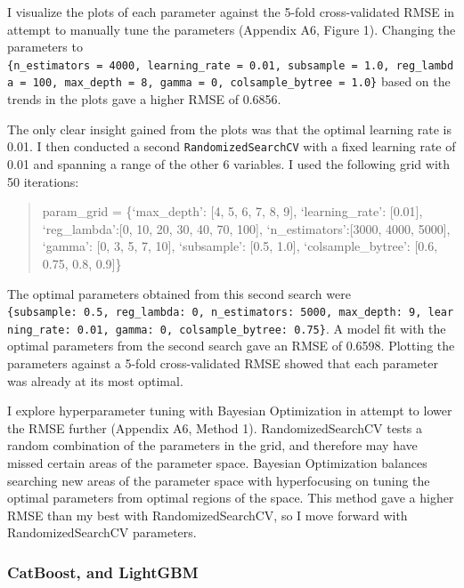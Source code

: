 \documentclass[
  letterpaper,
  DIV=11,
  numbers=noendperiod]{scrartcl}
\begin{document}
I visualize the plots of each parameter against the 5-fold
cross-validated RMSE in attempt to manually tune the parameters
(Appendix A6, Figure 1). Changing the parameters to
\texttt{\{n\_estimators\ =\ 4000,\ learning\_rate\ =\ 0.01,\ subsample\ =\ 1.0,\ reg\_lambda\ =\ 100,\ max\_depth\ =\ 8,\ gamma\ =\ 0,\ colsample\_bytree\ =\ 1.0\}}
based on the trends in the plots gave a higher RMSE of 0.6856.

The only clear insight gained from the plots was that the optimal
learning rate is 0.01. I then conducted a second
\texttt{RandomizedSearchCV} with a fixed learning rate of 0.01 and
spanning a range of the other 6 variables. I used the following grid
with 50 iterations:

\begin{quote}
param\_grid = \{`max\_depth': {[}4, 5, 6, 7, 8, 9{]}, `learning\_rate':
{[}0.01{]}, `reg\_lambda':{[}0, 10, 20, 30, 40, 70, 100{]},
`n\_estimators':{[}3000, 4000, 5000{]}, `gamma': {[}0, 3, 5, 7, 10{]},
`subsample': {[}0.5, 1.0{]}, `colsample\_bytree': {[}0.6, 0.75, 0.8,
0.9{]}\}
\end{quote}

The optimal parameters obtained from this second search were
\texttt{\{\textquotesingle{}subsample\textquotesingle{}:\ 0.5,\ \textquotesingle{}reg\_lambda\textquotesingle{}:\ 0,\ \textquotesingle{}n\_estimators\textquotesingle{}:\ 5000,\ \textquotesingle{}max\_depth\textquotesingle{}:\ 9,\ \textquotesingle{}learning\_rate\textquotesingle{}:\ 0.01,\ \textquotesingle{}gamma\textquotesingle{}:\ 0,\ \textquotesingle{}colsample\_bytree\textquotesingle{}:\ 0.75\}}.
A model fit with the optimal parameters from the second search gave an
RMSE of 0.6598. Plotting the parameters against a 5-fold cross-validated
RMSE showed that each parameter was already at its most optimal.

I explore hyperparameter tuning with Bayesian Optimization in attempt to
lower the RMSE further (Appendix A6, Method 1). RandomizedSearchCV tests
a random combination of the parameters in the grid, and therefore may
have missed certain areas of the parameter space. Bayesian Optimization
balances searching new areas of the parameter space with hyperfocusing
on tuning the optimal parameters from optimal regions of the space. This
method gave a higher RMSE than my best with RandomizedSearchCV, so I
move forward with RandomizedSearchCV parameters.

\hypertarget{catboost-and-lightgbm}{%
\subsubsection{CatBoost, and LightGBM}\label{catboost-and-lightgbm}}
\end{document}
